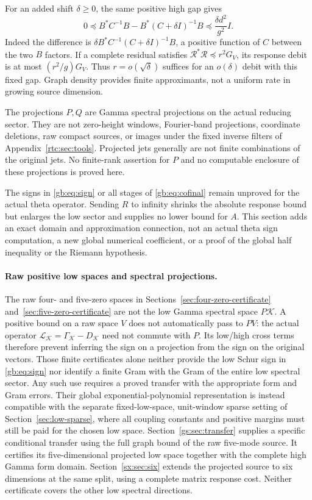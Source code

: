 \documentclass[11pt,a4paper]{article}
\numberwithin{equation}{section}
\theoremstyle{definition}\newtheorem{definition}[theorem]{Definition}
\theoremstyle{remark}\newtheorem{remark}[theorem]{Remark}
\newcommand{\Kk}{\mathcal K}\newcommand{\Aa}{\mathcal A}\newcommand{\Ff}{\mathcal F}
\begin{document}
For an added shift $\delta\ge0$, the same positive high gap gives
\[
 0\preceq B^*C^{-1}B-B^*(C+\delta I)^{-1}B
       \preceq\frac{\delta d^2}{g^2}I.
\]
Indeed the difference is
$\delta B^*C^{-1}(C+\delta I)^{-1}B$, a positive function of $C$
between the two $B$ factors. If a complete residual satisfies
$\mathcal R^*\mathcal R\preceq r^2G_V$, its response debit is at most
$(r^2/g)G_V$. Thus $r=o(\sqrt\delta)$ suffices for an $o(\delta)$
debit with this fixed gap. Graph density provides finite approximants,
not a uniform rate in growing source dimension.

The projections $P,Q$ are Gamma spectral projections on the actual
reducing sector. They are not zero-height windows, Fourier-band
projections, coordinate deletions, raw compact sources, or images under
the fixed inverse filters of Appendix~\ref{rtc:sec:tools}.
Projected jets generally are not finite combinations of the original
jets. No finite-rank assertion for $P$ and no computable enclosure of
these projections is proved here.

The signs in \eqref{gb:eq:sign} or all stages of
\eqref{gb:eq:cofinal} remain unproved for the actual theta operator.
Sending $R$ to infinity shrinks the absolute response bound but enlarges
the low sector and supplies no lower bound for $A$. This section adds
an exact domain and approximation connection, not an actual theta sign
computation, a new global numerical coefficient, or a proof of the global
half inequality or the Riemann hypothesis.

\paragraph{Raw positive low spaces and spectral projections.}
The raw four- and five-zero spaces in
Sections~\ref{sec:four-zero-certificate} and~\ref{sec:five-zero-certificate}
are not the low Gamma spectral space $P\Kk$. A positive bound on a raw
space $V$ does not automatically pass to $PV$: the actual operator
$\mathcal L_\Kk=\Gamma_\Kk-D_\Kk$ need not commute with $P$.
Its low/high cross terms therefore prevent inferring the sign on a
projection from the sign on the original vectors. Those finite
certificates alone neither provide the low Schur sign in
\eqref{gb:eq:sign} nor identify a finite Gram with the Gram of the entire
low spectral sector. Any such use requires a proved transfer with the
appropriate form and Gram errors. Their global exponential-polynomial
representation is instead compatible with the separate fixed-low-space,
unit-window sparse setting of Section~\ref{sec:low-sparse}, where all
coupling constants and positive margins must still be paid for the
chosen low space. Section~\ref{gs:sec:transfer} supplies a specific conditional transfer
using the full graph bound of the raw five-mode source. It certifies its
five-dimensional projected low space together with the complete high
Gamma form domain. Section~\ref{sx:sec:six} extends the projected source
to six dimensions at the same split, using a complete matrix response
cost. Neither certificate covers the other low spectral directions.
\end{document}
